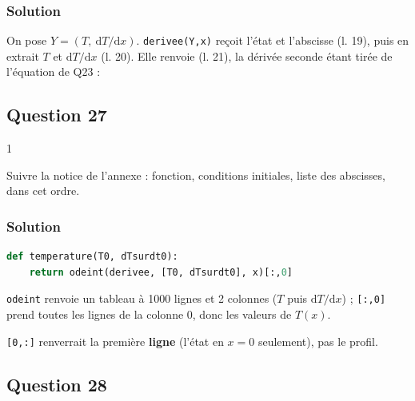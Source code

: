 \documentclass[11pt,a4paper]{article}
\newcommand{\equationajustee}[1]{%
  \sbox{\boiteequation}{$\displaystyle #1$}%
  \ifdim\wd\boiteequation>\linewidth
    \[\resizebox{\linewidth}{!}{\usebox{\boiteequation}}\]%
  \else
    \[#1\]%
  \fi}
\begin{document}
\hypertarget{solution-25}{%
\subsubsection{Solution}\label{solution-25}}

On pose \(Y=(T,\ \mathrm dT/\mathrm dx)\). \texttt{derivee(Y,x)} reçoit l'état et l'abscisse (l. 19), puis en extrait \(T\) et \(\mathrm dT/\mathrm dx\) (l. 20). Elle renvoie (l. 21), la dérivée seconde étant tirée de l'équation de Q23 :

\equationajustee{\frac{\mathrm dY}{\mathrm dx}=\left(\frac{\mathrm dT}{\mathrm dx},\ -\frac{\mathcal P}{2eS\lambda}\right)}

\hypertarget{question-27}{%
\subsection{Question 27}\label{question-27}}

\begin{indication}{1}

Suivre la notice de l'annexe : fonction, conditions initiales, liste des abscisses, dans cet ordre.

\end{indication}

\hypertarget{solution-26}{%
\subsubsection{Solution}\label{solution-26}}

\begin{lstlisting}[language=Python]
def temperature(T0, dTsurdt0):
    return odeint(derivee, [T0, dTsurdt0], x)[:,0]
\end{lstlisting}

\texttt{odeint} renvoie un tableau à 1000 lignes et 2 colonnes (\(T\) puis \(\mathrm dT/\mathrm dx\)) ; \texttt{{[}:,0{]}} prend toutes les lignes de la colonne 0, donc les valeurs de \(T(x)\).

\begin{piege}

\texttt{{[}0,:{]}} renverrait la première \textbf{ligne} (l'état en \(x=0\) seulement), pas le profil.

\end{piege}

\hypertarget{question-28}{%
\subsection{Question 28}\label{question-28}}
\end{document}
